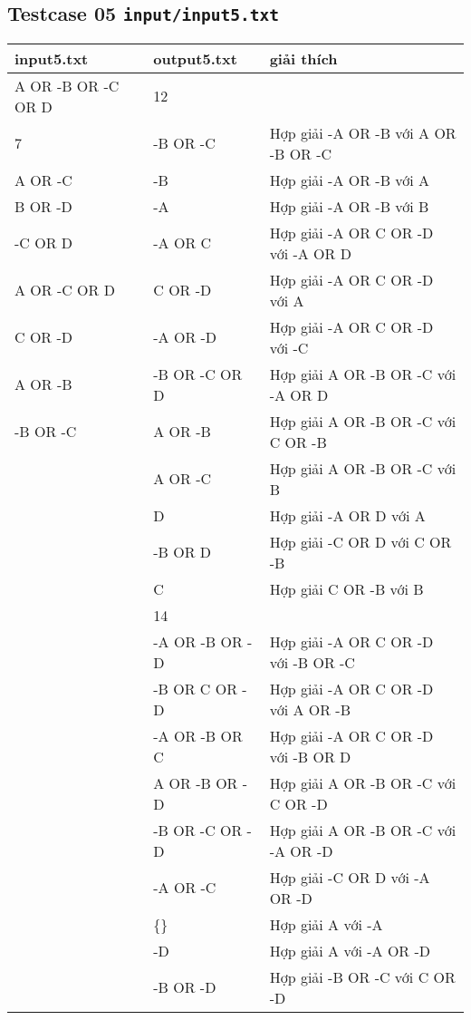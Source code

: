 \documentclass[12pt]{article}
\begin{document}
\subsection{Testcase 05 \texttt{input/input5.txt}}
\begin{table}[H]
    \centering
    \begin{tabular}{|l|l|l|}
        \hline
        input5.txt & output5.txt & giải thích  \\
        \hline
        A OR -B OR -C OR D & 12 & \\
        7 & -B OR -C & Hợp giải -A OR -B với A OR -B OR -C \\
        A OR -C & -B & Hợp giải -A OR -B với A \\
        B OR -D & -A & Hợp giải -A OR -B với B \\
        -C OR D & -A OR C & Hợp giải -A OR C OR -D với -A OR D \\
        A OR -C OR D & C OR -D & Hợp giải -A OR C OR -D với A \\
        C OR -D & -A OR -D & Hợp giải -A OR C OR -D với -C \\
        A OR -B & -B OR -C OR D & Hợp giải A OR -B OR -C với -A OR D \\
        -B OR -C & A OR -B & Hợp giải A OR -B OR -C với C OR -B \\
         & A OR -C & Hợp giải A OR -B OR -C với B \\
         & D & Hợp giải -A OR D với A \\
         & -B OR D & Hợp giải -C OR D với C OR -B \\
         & C & Hợp giải C OR -B với B \\
         & 14 & \\
         & -A OR -B OR -D & Hợp giải -A OR C OR -D với -B OR -C \\
         & -B OR C OR -D & Hợp giải -A OR C OR -D với A OR -B \\
         & -A OR -B OR C & Hợp giải -A OR C OR -D với -B OR D \\
         & A OR -B OR -D & Hợp giải A OR -B OR -C với C OR -D \\
         & -B OR -C OR -D & Hợp giải A OR -B OR -C với -A OR -D \\
         & -A OR -C & Hợp giải -C OR D với -A OR -D \\
         & \{\} & Hợp giải A với -A \\
         & -D & Hợp giải A với -A OR -D \\
         & -B OR -D & Hợp giải -B OR -C với C OR -D \\

\end{tabular}
\end{table}
\end{document}
